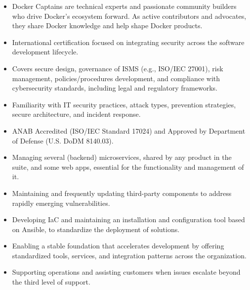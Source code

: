 \iflongversion
	\begin{itemize}
		\item Docker Captains are technical experts and passionate community builders who drive Docker’s ecosystem forward. As active contributors and advocates, they share Docker knowledge and help shape Docker products.
	\end{itemize}

	\begin{itemize}
		\item International certification focused on integrating security across the software development lifecycle. 
		\item Covers secure design, governance of ISMS (e.g., ISO/IEC 27001), risk management, policies/procedures development, and compliance with cybersecurity standards, including legal and regulatory frameworks.
		\item Familiarity with IT security practices, attack types, prevention strategies, secure architecture, and incident response.
		\item ANAB Accredited (ISO/IEC Standard 17024) and Approved by Department of Defense (U.S. DoDM 8140.03).
	\end{itemize}
	
\fi


\iflongversion
	\begin{itemize}
		\item Managing several (backend) microservices, shared by any product in the suite, and some web apps, essential for the functionality and management of it.
		\item Maintaining and frequently updating third-party components to address rapidly emerging vulnerabilities.
		\item  Developing IaC and maintaining an installation and configuration tool based on Ansible, to standardize the deployment of solutions.
		\item Enabling a stable foundation that accelerates development by offering standardized tools, services, and integration patterns across the organization.
		\item Supporting operations and assisting customers when issues escalate beyond the third level of support.
	\end{itemize}
	\smallskip

